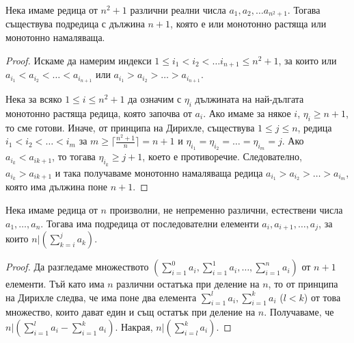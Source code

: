 \begin{lemma}
  Нека имаме редица от $n^2 + 1$ различни реални числа $a_1,a_2,\dots a_{n^2+1}$.
  Тогава съществува подредица с дължина $n+1$, която е или монотонно растяща или монотонно намаляваща.
\end{lemma}
\begin{proof}
  Искаме да намерим индекси $1\leq i_1<i_2<\dots i_{n+1}\leq n^2+1$, за които или $a_{i_1}<a_{i_2}<\dots< a_{i_{n+1}}$ или
  $a_{i_1}>a_{i_2}>\dots> a_{i_{n+1}}$.

  Нека за всяко $1\leq i \leq n^2+1$ да означим с $\eta_i$ дължината на най-дългата монотонно растяща редица, която започва от $a_i$.
  Ако имаме за някое $i$, $\eta_i \geq n+1$, то сме готови.
  Иначе, от принципа на Дирихле, съществува $1\leq j \leq n$, редица $i_1<i_2<\dots<i_m$ за $m \geq \lceil{\frac{n^2+1}{n}}\rceil = n+1$ и
  $\eta_{i_1} = \eta_{i_2} = \dots = \eta_{i_m} = j$.
  Ако $a_{i_k} < a_{i{k+1}}$, то тогава $\eta_{i_k}\geq j+1$, което е противоречие.
  Следователно, $a_{i_k} > a_{i{k+1}}$ и така получаваме монотонно намаляваща редица $a_{i_1} > a_{i_2} > \dots > a_{i_m}$, която има дължина поне $n+1$.
\end{proof}

\begin{problem}
  Нека имаме редица от $n$ произволни, не непременно различни, естествени числа $a_1,\dots,a_n$.
  Тогава има подредица от последователни елементи $a_i,a_{i+1},\dots,a_{j}$, за които $n | (\sum^{j}_{k=i}a_k)$.
\end{problem}
\begin{proof}
  Да разгледаме множеството $(\sum^0_{i=1}a_i,\sum^1_{i=1}a_i,\dots,\sum^n_{i=1}a_i)$ от $n+1$ елементи.
  Тъй като има $n$ различни остатъка при деление на $n$, то от принципа на Дирихле следва, че 
  има поне два елемента $\sum^l_{i=1}a_i, \sum^k_{i=1}a_i$ ($l<k$) от това множество, които дават един и същ остатък при деление на $n$.
  Получаваме, че $n|(\sum^l_{i=1}a_i - \sum^k_{i=1}a_i)$.
  Накрая, $n|(\sum^k_{i=l}a_i)$.
\end{proof}


